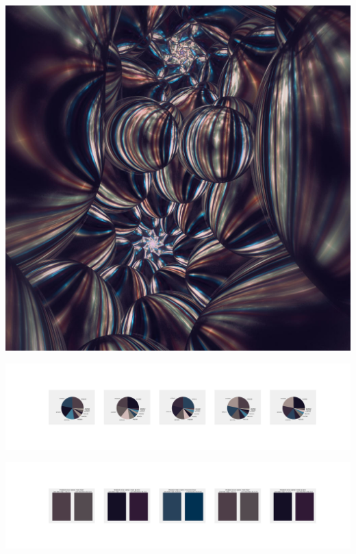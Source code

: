 \documentclass[11pt]{article}
\begin{document}
\begin{landscape}
    \begin{center}
    \includegraphics[width=\textwidth]{./nbimg/file (331).jpg}
    \end{center}

    \begin{center}
    \includegraphics[width=250mm]{./nbimg/pie-258.jpg}
    \end{center}

    \begin{center}
    \includegraphics[width=250mm]{./nbimg/peak-258.jpg}
    \end{center}
    


\end{landscape}
\end{document}
